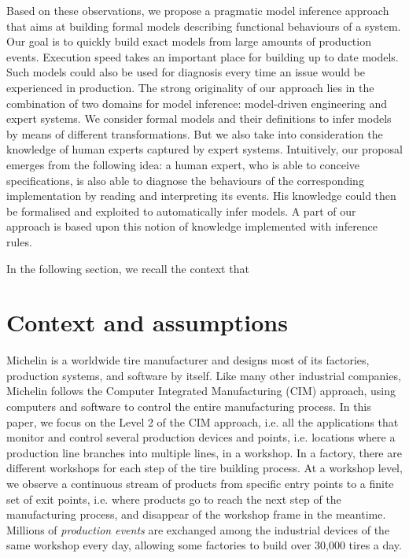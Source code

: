 Based on these observations, we propose a pragmatic model
inference approach that aims at building formal models describing
functional behaviours of a system. Our goal is to quickly build
exact models from large amounts of production events. Execution
speed takes an important place for building up to date models.
Such models could also be used for diagnosis every time an issue
would be experienced in production. The strong originality of our
approach lies in the combination of two domains for model
inference: model-driven engineering and expert systems. We
consider formal models and their definitions to infer models by
means of different transformations. But we also take into
consideration the knowledge of human experts captured by expert
systems. Intuitively, our proposal emerges from the following
idea: a human expert, who is able to conceive specifications, is
also able to diagnose the behaviours of the corresponding
implementation by reading and interpreting its events. His
knowledge could then be formalised and exploited to automatically
infer models. A part of our approach is based upon this notion of
knowledge implemented with inference rules.

In the following section, we recall the context that


\section{Context and assumptions}
\label{sec:modelinf:prodsystems:context}

Michelin is a worldwide tire manufacturer and designs most of its
factories, production systems, and software by itself.  Like
many other industrial companies, Michelin follows the Computer
Integrated Manufacturing (CIM) approach, using computers and
software to control the entire manufacturing process. In this
paper, we focus on the Level 2 of the CIM approach, i.e. all the
applications that monitor and control several production devices
and points, i.e. locations where a production line branches into
multiple lines, in a workshop. In a factory, there are different
workshops for each step of the tire building process. At a
workshop level, we observe a continuous stream of products from
specific entry points to a finite set of exit points, i.e. where
products go to reach the next step of the manufacturing process,
and disappear of the workshop frame in the meantime. Millions of
\emph{production events} are exchanged among the industrial
devices of the same workshop every day, allowing some factories
to build over 30,000 tires a day.


